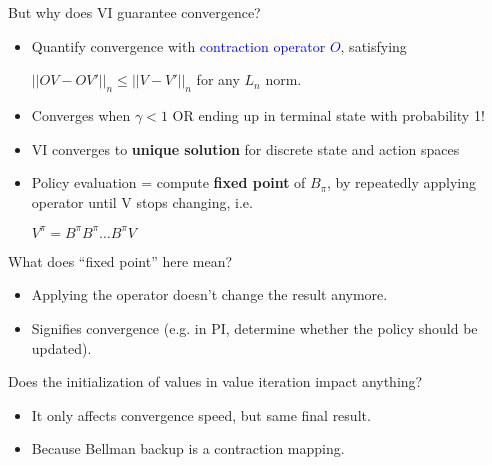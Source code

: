 \documentclass{article}
\begin{document}
But why does VI guarantee convergence?
\begin{itemize}
\item Quantify convergence with \textcolor{blue}{contraction operator $O$}, satisfying
    \begin{center}
        $||OV - OV'||_n \leq ||V - V'||_n$ for any $L_n$ norm.
    \end{center}
\item Converges when $\gamma < 1$ OR ending up in terminal state with probability 1!
\item VI converges to \textbf{unique solution} for discrete state and action spaces
\item Policy evaluation = compute \textbf{fixed point} of $B_{\pi}$, by repeatedly applying operator until V stops changing, i.e.
    \begin{center}
        $V^{\pi} = B^{\pi} B^{\pi} … B^{\pi} V$
    \end{center}
\end{itemize}

\begin{hintbox}
    What does “fixed point” here mean?
    \begin{prfbox}
        \begin{itemize}
            \item Applying the operator doesn't change the result anymore.
            \item Signifies convergence (e.g. in PI, determine whether the policy should be updated).
        \end{itemize}
    \end{prfbox}
    Does the initialization of values in value iteration impact anything?
    \begin{prfbox}
        \begin{itemize}
            \item It only affects convergence speed, but same final result. 
            \item Because Bellman backup is a contraction mapping.
        \end{itemize}
    \end{prfbox}
\end{hintbox}
\end{document}

